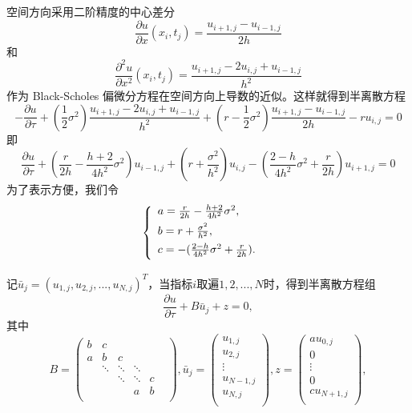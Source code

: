\documentclass{article}
\begin{document}
空间方向采用二阶精度的中心差分
$$\frac{\partial u}{\partial x}(x_i, t_j) = \frac{u_{i+1, j} - u_{i-1, j}}{2h}$$
和
$$\frac{\partial^2 u}{\partial x^2}(x_i, t_j) = \frac{u_{i+1, j} - 2u_{i, j} + u_{i-1, j}}{h^2}$$
作为 Black-Scholes 偏微分方程在空间方向上导数的近似。这样就得到半离散方程
$$-\frac{\partial u}{\partial \tau} + (\frac{1}{2}\sigma^2)\frac{u_{i+1, j} - 2u_{i, j} + u_{i-1, j}}{h^2} + (r - \frac{1}{2}\sigma^2)\frac{u_{i+1, j} - u_{i-1, j}}{2h} - ru_{i, j} = 0$$
即$$\frac{\partial u}{\partial \tau} + (\frac{r}{2h} - \frac{h+2}{4h^2}\sigma^2)u_{i-1, j} + (r + \frac{\sigma^2}{h^2})u_{i, j} - (\frac{2-h}{4h^2}\sigma^2 + \frac{r}{2h})u_{i+1, j} = 0$$
为了表示方便，我们令
\begin{equation}
\left\{
        \begin{array}{lr}
        \vspace{1ex}
        a = \frac{r}{2h} - \frac{h+2}{4h^2}\sigma^2, & \\
        \vspace{1ex}
        b = r + \frac{\sigma^2}{h^2}, & \\
        \vspace{1ex}
        c = -(\frac{2-h}{4h^2}\sigma^2 + \frac{r}{2h}). &  
        \end{array}
\right.
\nonumber
\end{equation}

记$\bar{u}_j = (u_{1, j}, u_{2, j},...,u_{N, j})^T$，当指标$i$取遍$1,2,...,N$时，得到半离散方程组
$$\frac{\partial u}{\partial \tau} + B\bar{u}_j + z = 0, $$
其中$$
B = \begin{pmatrix}
        b &   c    &        &        &   & \\
        a &   b    &   c    &        &   & \\
          & \ddots & \ddots & \ddots &   & \\
          &        & \ddots & \ddots & c & \\
          &        &        &   a    & b & \\
    \end{pmatrix},
\bar{u}_j = \begin{pmatrix}
        u_{1, j}   \\
        u_{2, j}   \\
        \vdots     \\
        u_{N-1, j} \\
        u_{N, j}   \\
    \end{pmatrix},
z = \begin{pmatrix}
        au_{0, j}   \\
        0           \\
        \vdots      \\
        0           \\
        cu_{N+1, j} \\
    \end{pmatrix},
$$
\end{document}
